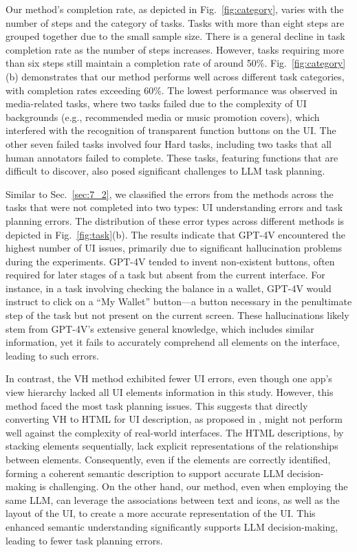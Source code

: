 Our method's completion rate, as depicted in Fig.~\ref{fig:category}, varies with the number of steps and the category of tasks. Tasks with more than eight steps are grouped together due to the small sample size. There is a general decline in task completion rate as the number of steps increases. However, tasks requiring more than six steps still maintain a completion rate of around 50\%. Fig.~\ref{fig:category}(b) demonstrates that our method performs well across different task categories, with completion rates exceeding 60\%. The lowest performance was observed in media-related tasks, where two tasks failed due to the complexity of UI backgrounds (e.g., recommended media or music promotion covers), which interfered with the recognition of transparent function buttons on the UI. The other seven failed tasks involved four Hard tasks, including two tasks that all human annotators failed to complete. These tasks, featuring functions that are difficult to discover, also posed significant challenges to LLM task planning.

Similar to Sec.~\ref{sec:7_2}, we classified the errors from the methods across the tasks that were not completed into two types: UI understanding errors and task planning errors. The distribution of these error types across different methods is depicted in Fig.~\ref{fig:task}(b). The results indicate that GPT-4V encountered the highest number of UI issues, primarily due to significant hallucination problems during the experiments. GPT-4V tended to invent non-existent buttons, often required for later stages of a task but absent from the current interface. For instance, in a task involving checking the balance in a wallet, GPT-4V would instruct to click on a ``My Wallet'' button—a button necessary in the penultimate step of the task but not present on the current screen. These hallucinations likely stem from GPT-4V's extensive general knowledge, which includes similar information, yet it fails to accurately comprehend all elements on the interface, leading to such errors.

In contrast, the VH method exhibited fewer UI errors, even though one app's view hierarchy lacked all UI elements information in this study. However, this method faced the most task planning issues. This suggests that directly converting VH to HTML for UI description, as proposed in \cite{wang2023enabling}, might not perform well against the complexity of real-world interfaces. The HTML descriptions, by stacking elements sequentially, lack explicit representations of the relationships between elements. Consequently, even if the elements are correctly identified, forming a coherent semantic description to support accurate LLM decision-making is challenging. On the other hand, our method, even when employing the same LLM, can leverage the associations between text and icons, as well as the layout of the UI, to create a more accurate representation of the UI. This enhanced semantic understanding significantly supports LLM decision-making, leading to fewer task planning errors.

